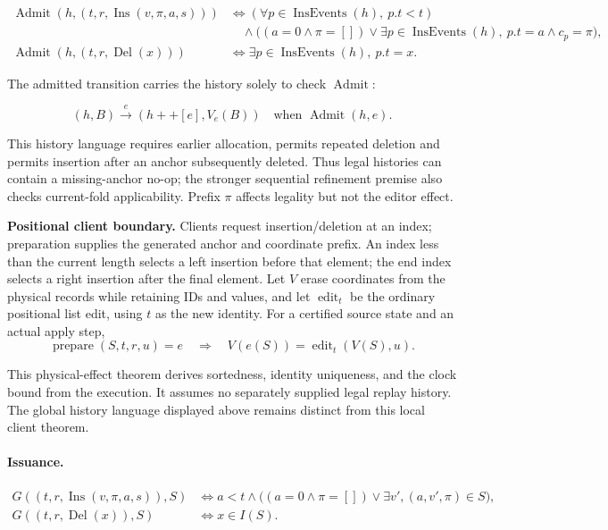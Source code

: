 \[
\begin{aligned}\operatorname{Admit}(h,(t,r,\operatorname{Ins}(v,\pi,a,s)))&\iff(\forall p\in\operatorname{InsEvents}(h),\ p.t<t)\\&\quad\land\big((a=0\land\pi=[])\lor\exists p\in\operatorname{InsEvents}(h),\ p.t=a\land c_p=\pi\big),\\\operatorname{Admit}(h,(t,r,\operatorname{Del}(x)))&\iff\exists p\in\operatorname{InsEvents}(h),\ p.t=x.\end{aligned}
\]


The admitted transition carries the history solely to check $\operatorname{Admit}$:

\[
(h,B)\xrightarrow{e}(h++[e],V_e(B))\quad\text{when }\operatorname{Admit}(h,e).
\]


This history language requires earlier allocation, permits repeated deletion and permits insertion after an anchor subsequently deleted. Thus legal histories can contain a missing-anchor no-op; the stronger sequential refinement premise also checks current-fold applicability. Prefix $\pi$ affects legality but not the editor effect.

\textbf{Positional client boundary.} Clients request insertion/deletion at an index; preparation supplies the generated anchor and coordinate prefix. An index
less than the current length selects a left insertion before that element;
the end index selects a right insertion after the final element. Let $V$ erase coordinates from the physical records while retaining IDs and values, and let $\operatorname{edit}_t$ be the ordinary positional list edit, using $t$ as the new identity. For a certified source state and an actual apply step,
\[
\operatorname{prepare}(S,t,r,u)=e\quad\Longrightarrow\quad V(e(S))=\operatorname{edit}_t(V(S),u).
\]

This physical-effect theorem derives sortedness, identity uniqueness, and the clock bound from the execution. It assumes no separately supplied legal replay history. The global history language displayed above remains distinct from this local client theorem.


\paragraph{Issuance.}
\[
\begin{aligned}G((t,r,\operatorname{Ins}(v,\pi,a,s)),S)&\iff a<t\land\big((a=0\land\pi=[])\lor\exists v',(a,v',\pi)\in S\big),\\G((t,r,\operatorname{Del}(x)),S)&\iff x\in I(S).\end{aligned}
\]


